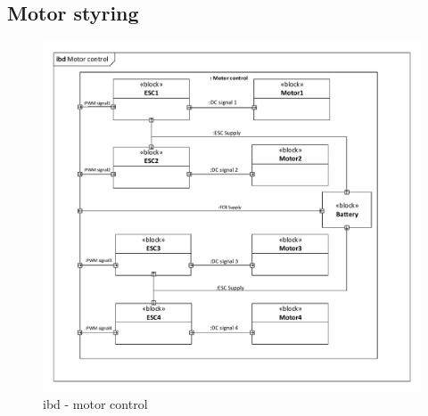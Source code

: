 \subsection{Motor styring}

\begin{figure}[H]
\centering
\includegraphics[width=1\textwidth]{Billeder/IBD/ibd6_motorcontrol.pdf}
\caption{ibd - motor control}
\label{fig:ibd_motorcontrol}
\end{figure}

